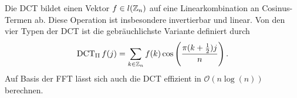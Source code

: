 \begin{definition}
Die DCT bildet einen Vektor $ f \in l(\mathbb{Z}_{n}) $ auf eine Linearkombination an Cosinus-Termen ab.
Diese Operation ist insbesondere invertierbar und linear. Von den vier Typen der DCT ist die 
gebräuchlichste Variante definiert durch
\[
  \DCT2 f(j) = \sum_{k \in \Z_{n}} f(k) \cos \left( \frac{\pi (k + \frac{1}{2})j}{n} \right).
\]
Auf Basis der FFT lässt sich auch die DCT effizient in $ \mathcal{O}(n \log(n)) $ berechnen.
\end{definition}